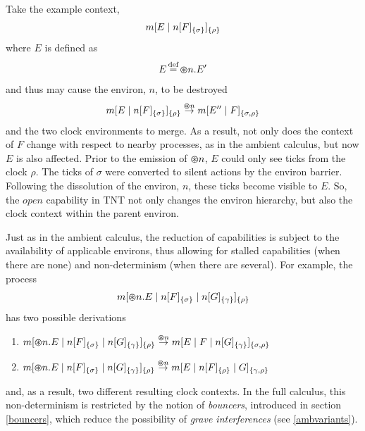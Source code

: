 Take the example context,
\begin{equation}
{m}[ E\;|\;{n}[ F ]_{\{\sigma\}} ]_{\{\rho\}}
\end{equation}
where $E$ is defined as
\begin{equation}
E \operatorname{\stackrel{\textrm{def}}{=}} \varoast n.E^\prime
\end{equation}
and thus may cause the environ, $n$, to be destroyed
\begin{equation}
{m}[ E\;|\;{n}[ F ]_{\{\sigma\}} ]_{\{\rho\}} \stackrel{\varoast n}{\rightarrow}
{m}[ E'^\prime\;|\;F ]_{\{\sigma, \rho\}}
\end{equation}
and the two clock environments to merge.  As a result, not
only does the context of $F$ change with respect to nearby processes, as
in the ambient calculus, but now $E$ is also affected.  Prior to the
emission of $\varoast n$, $E$ could only see ticks from the clock
$\rho$.  The ticks of $\sigma$ were converted to silent actions by the
environ barrier.  Following the dissolution of the environ, $n$, these
ticks become visible to $E$.  So, the $open$ capability in TNT not only
changes the environ hierarchy, but also the clock context within the
parent environ.

Just as in the ambient calculus, the reduction of capabilities is
subject to the availability of applicable environs, thus allowing for
stalled capabilities (when there are none) and non-determinism (when
there are several). For example, the process
\begin{equation}
{m}[ \varoast n.E\;|\;{n}[ F ]_{\{\sigma\}}\;|\;{n}[ G ]_{\{\gamma\}} ]_{\{\rho\}}
\end{equation}
has two possible derivations

\begin{enumerate}
\item
      ${m}[ \varoast n.E\;|\;{n}[ F ]_{\{\sigma\}}\;|\;{n}[ G ]_{\{\gamma\}} ]_{\{\rho\}}
      \stackrel{\varoast n}{\rightarrow} {m}[ E \;|\; F \;|\;
      {n}[ G ]_{\{\gamma\}} ]_{\{\sigma , \rho\}}$
\item
      ${m}[ \varoast n.E\;|\;{n}[ F ]_{\{\sigma\}}\;|\;{n}[ G ]_{\{\gamma\}} ]_{\{\rho\}}
      \stackrel{\varoast n}{\rightarrow} {m}[ E \;|\; {n}[ F ]_{\{\rho\}} \;|\; G ]_{\{\gamma , \rho\}}$
\end{enumerate}
and, as a result, two different resulting clock contexts.  In
the full calculus, this non-determinism is restricted by the notion of
\emph{bouncers}, introduced in section \ref{bouncers}, which reduce the possibility of \emph{grave interferences} (see \ref{ambvariants}).  

